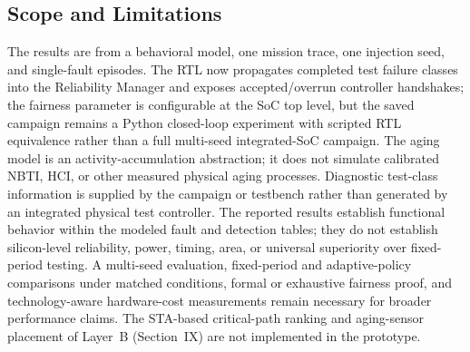 \documentclass[journal]{IEEEtran}
\begin{document}
\subsection{Scope and Limitations}
The results are from a behavioral model, one mission trace, one injection seed, and single-fault episodes. The RTL now propagates completed test failure classes into the Reliability Manager and exposes accepted/overrun controller handshakes; the fairness parameter is configurable at the SoC top level, but the saved campaign remains a Python closed-loop experiment with scripted RTL equivalence rather than a full multi-seed integrated-SoC campaign. The aging model is an activity-accumulation abstraction; it does not simulate calibrated NBTI, HCI, or other measured physical aging processes. Diagnostic test-class information is supplied by the campaign or testbench rather than generated by an integrated physical test controller. The reported results establish functional behavior within the modeled fault and detection tables; they do not establish silicon-level reliability, power, timing, area, or universal superiority over fixed-period testing. A multi-seed evaluation, fixed-period and adaptive-policy comparisons under matched conditions, formal or exhaustive fairness proof, and technology-aware hardware-cost measurements remain necessary for broader performance claims. The STA-based critical-path ranking and aging-sensor placement of Layer~B (Section~IX) are not implemented in the prototype.
\end{document}
